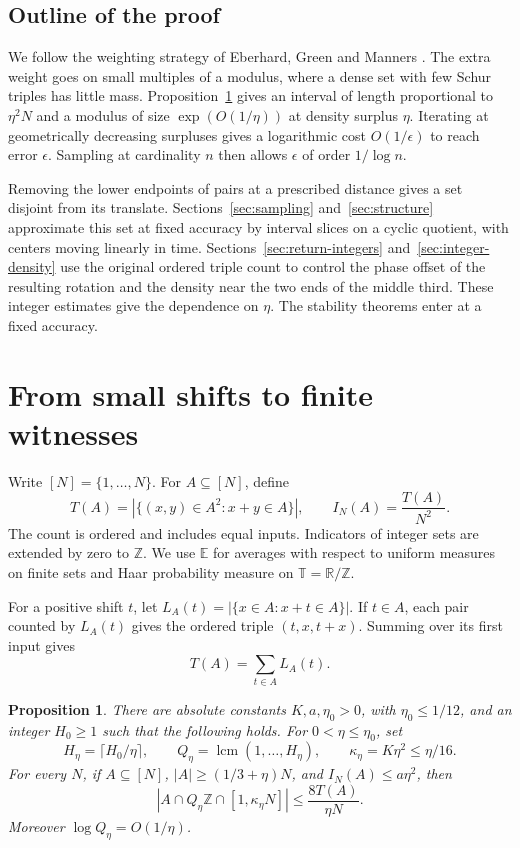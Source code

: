 \documentclass[11pt,reqno]{amsart}
\newtheorem{proposition}[theorem]{Proposition}
\DeclareMathOperator{\lcm}{lcm}
\newcommand{\Z}{\mathbb Z}
\newcommand{\R}{\mathbb R}
\newcommand{\T}{\mathbb T}
\newcommand{\E}{\mathbb E}
\numberwithin{equation}{section}
\begin{document}
\subsection*{Outline of the proof}
We follow the weighting strategy of Eberhard, Green and Manners
\cite[Sections~3 and~5]{egm}. The extra weight goes on small multiples
of a modulus, where a dense set with few Schur triples has little
mass. Proposition~\ref{prop:shifts} gives an interval of length
proportional to \(\eta^2 N\) and a modulus of size \(\exp(O(1/\eta))\)
at density surplus \(\eta\). Iterating at geometrically decreasing
surpluses gives a logarithmic cost \(O(1/\epsilon)\) to reach error
\(\epsilon\). Sampling at cardinality \(n\) then allows
\(\epsilon\) of order \(1/\log n\).

Removing the lower endpoints of pairs at a prescribed distance
gives a set disjoint from its translate. Sections~\ref{sec:sampling}
and~\ref{sec:structure} approximate this set at fixed accuracy by
interval slices on a cyclic quotient, with centers moving linearly
in time. Sections~\ref{sec:return-integers} and~\ref{sec:integer-density}
use the original ordered triple count to control the phase offset
of the resulting rotation and the density near the two ends of
the middle third. These integer estimates give the dependence on
\(\eta\). The stability theorems enter at a fixed accuracy.

\section{From small shifts to finite witnesses}\label{sec:witnesses}

Write \([N]=\{1,\dots,N\}\). For \(A\subseteq[N]\), define
\[
 T(A)=|\{(x,y)\in A^2:x+y\in A\}|,\qquad I_N(A)=\frac{T(A)}{N^2}.
\]
The count is ordered and includes equal inputs. Indicators of
integer sets are extended by zero to \(\Z\). We use \(\E\) for
averages with respect to uniform measures on finite sets and Haar
probability measure on \(\T=\R/\Z\).

For a positive shift \(t\), let \(L_A(t)=|\{x\in A:x+t\in A\}|\).
If \(t\in A\), each pair counted by \(L_A(t)\) gives the ordered
triple \((t,x,t+x)\). Summing over its first input gives
\begin{equation}\label{eq:shift-triples}
 T(A)=\sum_{t\in A}L_A(t).
\end{equation}

\begin{proposition}\label{prop:shifts}
There are absolute constants \(K,a,\eta_0>0\), with \(\eta_0\le1/12\),
and an integer \(H_0\ge1\) such that the following holds. For
\(0<\eta\le\eta_0\), set
\[
 H_\eta=\lceil H_0/\eta\rceil,\qquad Q_\eta=\lcm(1,\dots,H_\eta),
 \qquad \kappa_\eta=K\eta^2\le \eta/16.
\]
For every \(N\), if \(A\subseteq[N]\), \(|A|\ge(1/3+\eta)N\), and
\(I_N(A)\le a\eta^2\), then
\begin{equation}\label{eq:origin}
 |A\cap Q_\eta\Z\cap[1,\kappa_\eta N]|\le \frac{8 T(A)}{\eta N}.
\end{equation}
Moreover \(\log Q_\eta=O(1/\eta)\).
\end{proposition}
\end{document}
